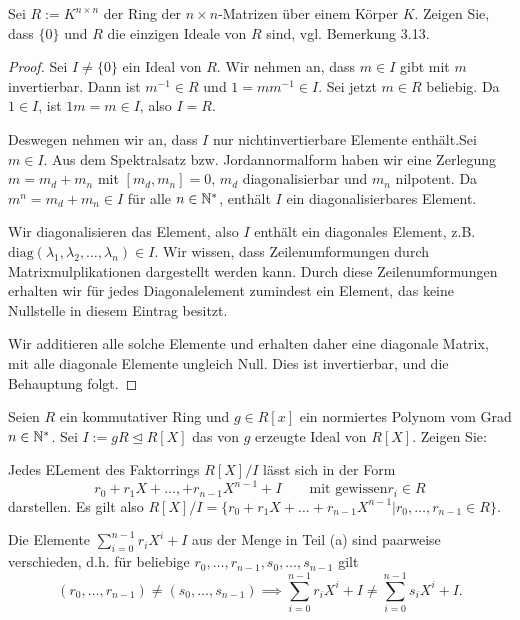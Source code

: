 \begin{Problem}
	Sei $R:=K^{n\times n}$ der Ring der $n\times n$-Matrizen über einem Körper $K$. Zeigen Sie, dass $\{0\} $ und $R$ die einzigen Ideale von $R$ sind, vgl. Bemerkung 3.13.
\end{Problem}
\begin{proof}
	Sei $I\neq \{0\} $ ein Ideal von $R$. Wir nehmen an, dass $m\in I$ gibt mit $m$ invertierbar. Dann ist $m^{-1}\in R$ und $1 = m m^{-1}\in I$. Sei jetzt $m\in R$ beliebig. Da $1\in I$, ist $1m=m\in I$, also $I=R$.

	Deswegen nehmen wir an, dass $I$ nur nichtinvertierbare Elemente enthält.Sei $m\in I$. Aus dem Spektralsatz bzw. Jordannormalform haben wir eine Zerlegung $m=m_d+m_n$ mit $[m_d,m_n]=0$, $m_d$ diagonalisierbar und $m_n$ nilpotent. Da $m^n=m_d+m_n\in I$ f\"{u}r alle $n\in \mathbb{N}^*$, enthält $I$ ein diagonalisierbares Element. 

	Wir diagonalisieren das Element, also $I$ enthält ein diagonales Element, z.B. $\text{diag}(\lambda_1,\lambda_2,\dots, \lambda_n)\in I$. Wir wissen, dass Zeilenumformungen durch Matrixmulplikationen dargestellt werden kann. Durch diese Zeilenumformungen erhalten wir f\"{u}r jedes Diagonalelement zumindest ein Element, das keine Nullstelle in diesem Eintrag besitzt. 

	Wir additieren alle solche Elemente und erhalten daher eine diagonale Matrix, mit alle diagonale Elemente ungleich Null. Dies ist invertierbar, und die Behauptung folgt.
\end{proof}
\begin{Problem}
	Seien $R$ ein kommutativer Ring und $g\in R[x]$ ein normiertes Polynom vom Grad $n\in \mathbb{N}^*$. Sei $I:=gR\trianglelefteq R[X]$ das von $g$ erzeugte Ideal von $R[X]$. Zeigen Sie:
	\begin{parts}
		\item Jedes ELement des Faktorrings $R[X] / I$ lässt sich in der Form
			\[
				r_0+r_1X+\dots, +r_{n-1}X^{n-1}+I\qquad\text{mit gewissen}r_i\in R
			\]
			darstellen. Es gilt also $R[X] / I=\{r_0+r_1X+\dots+r_{n-1}X^{n-1}|r_0,\dots, r_{n-1}\in R\} $.
		\item Die Elemente $\sum_{i=0}^{n-1}r_i X^i +I$ aus der Menge in Teil (a) sind paarweise verschieden, d.h. f\"{u}r beliebige $r_0,\dots, r_{n-1},s_0,\dots, s_{n-1}$ gilt
			\[
				(r_0,\dots, r_{n-1})\neq (s_0,\dots, s_{n-1})\implies \sum_{i=0}^{n-1} r_i X^i+I\neq \sum_{i=0}^{n-1}s_i X^i+I
			.\] 
	\end{parts}
\end{Problem}

